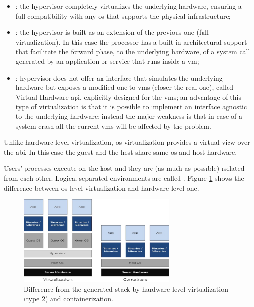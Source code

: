 \begin{itemize}
	\item{: the hypervisor completely virtualizes the underlying hardware,
		ensuring a full compatibility with any \acs{os} that supports the physical infrastructure;}
	\item{: the hypervisor is built as an extension of the
		previous one (full-virtualization). In this case the processor has a built-in architectural support
		that facilitate the forward phase, to the underlying hardware, of a system call generated by an
		application or service that runs inside a \ac{vm};}
	\item{: hypervisor does not offer an interface that simulates the
		underlying hardware but exposes a modified one to \ac{vm}s (closer the real one), called Virtual
		Hardware \acs{api}, explicitly designed for the \ac{vm}s; an advantage of this type of virtualization
		is that it is possible to implement an interface agnostic to the underlying hardware; instead
		the major weakness is that in case of a system crash all the current \ac{vm}s will be affected by
		the problem.}
\end{itemize}

Unlike hardware level virtualization, \acs{os}-virtualization  provides a virtual view over the
\ac{abi}. In this case the guest and the host share same \acs{os} and host hardware.

Users' processes execute on the host and they are (as much as possible) isolated from each other.
Logical separated environments are called .
Figure \ref{img:problemSpace-paas-virtualization-assets-virtualizationTypeDifference} shows the
difference between \acs{os} level virtualization and hardware level one.

\begin{figure}
	\centering{}
	\includegraphics[width=0.7\textwidth]{chapters/problem/images/containerization.png}
	\caption[Difference from containerization and virtualization]{Difference from the generated stack
		by hardware level virtualization (type 2) and containerization.}
	\label{img:problemSpace-paas-virtualization-assets-virtualizationTypeDifference}
\end{figure}

